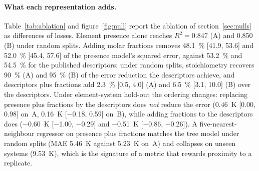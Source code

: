 \documentclass{iopjournal}
\newcommand{\Rsq}{R^{2}}
\newcommand{\ci}[2]{[\num{#1}, \num{#2}]}
\begin{document}
\paragraph{What each representation adds.} Table~\ref{tab:ablation} and figure~\ref{fig:null}
report the ablation of section~\ref{sec:nulls} as differences of losses. Element presence alone
reaches $\Rsq = \num{0.847}$ (A) and \num{0.850} (B) under random splits. Adding molar fractions
removes \SI{48.1}{\percent} \ci{41.9}{53.6} and \SI{52.0}{\percent} \ci{45.4}{57.6} of the
presence model's squared error, against \SI{53.2}{\percent} and \SI{54.5}{\percent} for the
published descriptors: under random splits, stoichiometry recovers \SI{90}{\percent} (A) and
\SI{95}{\percent} (B) of the error reduction the descriptors achieve, and descriptors plus fractions
add \SI{2.3}{\percent} \ci{0.5}{4.0} (A) and \SI{6.5}{\percent} \ci{3.1}{10.0} (B) over the
descriptors. Under element-system hold-out the ordering changes: replacing presence plus fractions
by the descriptors does \emph{not} reduce the error (\SI{+0.46}{\kelvin} \ci{+0.00}{+0.98} on~A,
\SI{+0.16}{\kelvin} \ci{-0.18}{+0.59} on~B), while adding fractions to the descriptors does
(\SI{-0.60}{\kelvin} \ci{-1.00}{-0.29} and \SI{-0.51}{\kelvin} \ci{-0.86}{-0.26}). A
five-nearest-neighbour regressor on presence plus fractions matches the tree model under random
splits (MAE \SI{5.46}{\kelvin} against \SI{5.23}{\kelvin} on~A) and collapses on unseen systems
(\SI{9.53}{\kelvin}), which is the signature of a metric that rewards proximity to a replicate.
\end{document}
